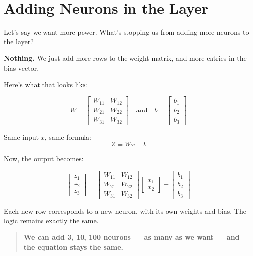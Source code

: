 \documentclass[11pt]{article}
\begin{document}
\section{Adding Neurons in the Layer}

Let’s say we want more power.  
What’s stopping us from adding more neurons to the layer?

\begin{recapbox}[title=Answer]
\textbf{Nothing.} We just add more rows to the weight matrix, and more entries in the bias vector.
\end{recapbox}

Here’s what that looks like:

\[
W =
\begin{bmatrix}
W_{11} & W_{12} \\
W_{21} & W_{22} \\
W_{31} & W_{32}
\end{bmatrix}
\quad \text{and} \quad
b =
\begin{bmatrix}
b_1 \\
b_2 \\
b_3
\end{bmatrix}
\]

Same input $x$, same formula:
\[
Z = W x + b
\]

Now, the output becomes:

\[
\begin{bmatrix}
z_1 \\
z_2 \\
z_3
\end{bmatrix}
=
\begin{bmatrix}
W_{11} & W_{12} \\
W_{21} & W_{22} \\
W_{31} & W_{32}
\end{bmatrix}
\begin{bmatrix}
x_1 \\
x_2
\end{bmatrix}
+
\begin{bmatrix}
b_1 \\
b_2 \\
b_3
\end{bmatrix}
\]

Each new row corresponds to a new neuron, with its own weights and bias.  
The logic remains exactly the same.

\begin{quote}
\textbf{We can add 3, 10, 100 neurons — as many as we want — and the equation stays the same.}
\end{quote}
\end{document}

